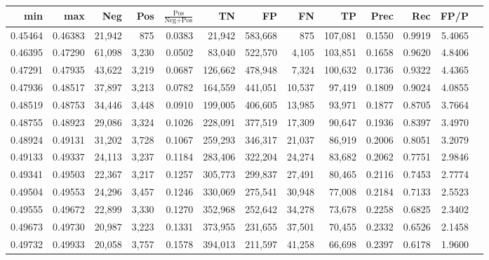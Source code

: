\begin{tabular}{rrrrrrrrrrrrr}
\toprule
    min &     max &    Neg &   Pos & $\frac{\text{Pos}}{\text{Neg}+\text{Pos}}$ &      TN &      FP &      FN &      TP &   Prec &    Rec &   FP/P \\
\midrule
0.45464 & 0.46383 & 21,942 &   875 &                                     0.0383 &  21,942 & 583,668 &     875 & 107,081 & 0.1550 & 0.9919 & 5.4065 \\
0.46395 & 0.47290 & 61,098 & 3,230 &                                     0.0502 &  83,040 & 522,570 &   4,105 & 103,851 & 0.1658 & 0.9620 & 4.8406 \\
0.47291 & 0.47935 & 43,622 & 3,219 &                                     0.0687 & 126,662 & 478,948 &   7,324 & 100,632 & 0.1736 & 0.9322 & 4.4365 \\
0.47936 & 0.48517 & 37,897 & 3,213 &                                     0.0782 & 164,559 & 441,051 &  10,537 &  97,419 & 0.1809 & 0.9024 & 4.0855 \\
0.48519 & 0.48753 & 34,446 & 3,448 &                                     0.0910 & 199,005 & 406,605 &  13,985 &  93,971 & 0.1877 & 0.8705 & 3.7664 \\
0.48755 & 0.48923 & 29,086 & 3,324 &                                     0.1026 & 228,091 & 377,519 &  17,309 &  90,647 & 0.1936 & 0.8397 & 3.4970 \\
0.48924 & 0.49131 & 31,202 & 3,728 &                                     0.1067 & 259,293 & 346,317 &  21,037 &  86,919 & 0.2006 & 0.8051 & 3.2079 \\
0.49133 & 0.49337 & 24,113 & 3,237 &                                     0.1184 & 283,406 & 322,204 &  24,274 &  83,682 & 0.2062 & 0.7751 & 2.9846 \\
0.49341 & 0.49503 & 22,367 & 3,217 &                                     0.1257 & 305,773 & 299,837 &  27,491 &  80,465 & 0.2116 & 0.7453 & 2.7774 \\
0.49504 & 0.49553 & 24,296 & 3,457 &                                     0.1246 & 330,069 & 275,541 &  30,948 &  77,008 & 0.2184 & 0.7133 & 2.5523 \\
0.49555 & 0.49672 & 22,899 & 3,330 &                                     0.1270 & 352,968 & 252,642 &  34,278 &  73,678 & 0.2258 & 0.6825 & 2.3402 \\
0.49673 & 0.49730 & 20,987 & 3,223 &                                     0.1331 & 373,955 & 231,655 &  37,501 &  70,455 & 0.2332 & 0.6526 & 2.1458 \\
0.49732 & 0.49933 & 20,058 & 3,757 &                                     0.1578 & 394,013 & 211,597 &  41,258 &  66,698 & 0.2397 & 0.6178 & 1.9600 \\

\end{tabular}
